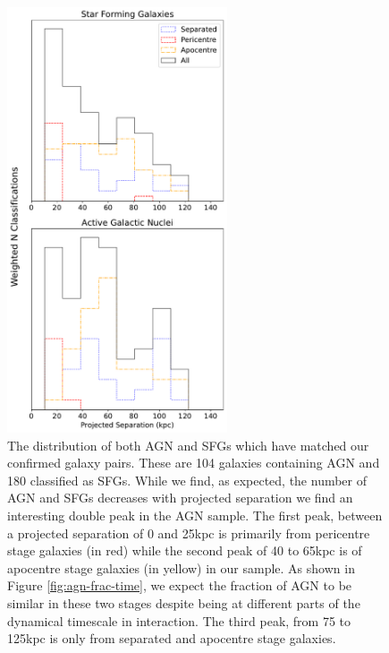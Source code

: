 \begin{figure}
\centering
\includegraphics[width=0.58\textwidth]{Chapter3/figures/sfg-agn-dist.pdf}
\caption[The distribution of both AGN and SFGs which have been matched our confirmed galaxy pairs.]{The distribution of both AGN and SFGs which have matched our confirmed galaxy pairs. These are 104 galaxies containing AGN and 180 classified as SFGs. While we find, as expected, the number of AGN and SFGs decreases with projected separation we find an interesting double peak in the AGN sample. The first peak, between a projected separation of 0 and 25kpc is primarily from pericentre stage galaxies (in red) while the second peak of 40 to 65kpc is of apocentre stage galaxies (in yellow) in our sample. As shown in Figure \ref{fig:agn-frac-time}, we expect the fraction of AGN to be similar in these two stages despite being at different parts of the dynamical timescale in interaction. The third peak, from 75 to 125kpc is only from separated and apocentre stage galaxies.}
\label{fig:sfg-agn-proj}
\end{figure}

